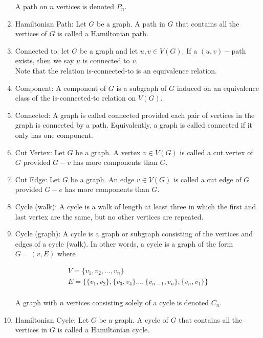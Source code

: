 \documentclass{article}
\begin{document}
\begin{enumerate}
		A path on $n$ vertices is denoted $P_n$.
		
		\item Hamiltonian Path: Let $G$ be a graph.
		A path in $G$ that contains all the vertices of $G$ is called a Hamiltonian path.
		
		\item Connected to: let $G$ be a graph and let $u,v\in V(G)$.
		If a $(u,v)-$path exists, then we say $u$ is connected to $v$.\\
		
		Note that the relation is-connected-to is an equivalence relation.
		
		\item Component: A component of $G$ is a subgraph of $G$ induced on an equivalence class of the is-connected-to relation on $V(G)$.
		
		\item Connected: A graph is called connected provided each pair of vertices in the graph is connected by a path.
		Equivalently, a graph is called connected if it only has one component.
		
		\item Cut Vertex: Let $G$ be a graph.
		A vertex $v\in V(G)$ is called a cut vertex of $G$ provided $G-v$ has more components than $G$.
		
		\item Cut Edge: Let $G$ be a graph.
		An edge $v\in V(G)$ is called a cut edge of $G$ provided $G-e$ has more components than $G$.
		
		\item Cycle (walk): A cycle is a walk of length at least three in which the first and last vertex are the same, but no other vertices are repeated.
		
		\item Cycle (graph): A cycle is a graph or subgraph consisting of the vertices and edges of a cycle (walk).
		In other words, a cycle is a graph of the form $G=(v,E)$ where
		
		\begin{gather*}
			V=\{v_1,v_2,\dots,v_n\} \:\: \\
			E=\{\{v_1, v_2\}, \{v_3, v_4\}\dots,\{v_{n-1}, v_n\},\{v_n, v_1\}\}\\
		\end{gather*}
		
		A graph with $n$ vertices consisting solely of a cycle is denoted $C_n$.
		
		\item Hamiltonian Cycle: Let $G$ be a graph.
		A cycle of $G$ that contains all the vertices in $G$ is called a Hamiltonian cycle.
		

\end{enumerate}
\end{document}
